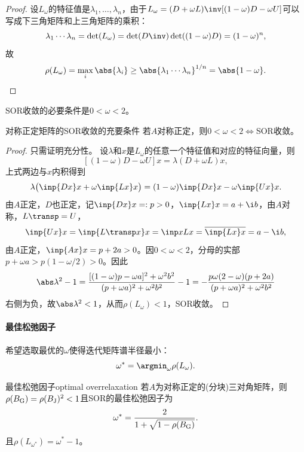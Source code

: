 \begin{proof}
    设$L_\omega$的特征值是$\lambda_1,\ldots,\lambda_n$，由于$L_\omega=(D+\omega L)\inv[(1-\omega)D-\omega U]$可以写成下三角矩阵和上三角矩阵的乘积：
    \[
        \lambda_1\cdots\lambda_n=\det(L_\omega)=\det(D\inv)\det((1-\omega)D)=(1-\omega)^n,
    \]
    故
    \[
        \rho(L_\omega)=\max_i\abs{\lambda_i}\geq\abs{\lambda_1\cdots\lambda_n}^{1/n}=\abs{1-\omega}.
        \qedhere
    \]
\end{proof}

\begin{corollary}
    SOR收敛的必要条件是$0<\omega<2$。
\end{corollary}

\begin{theorem}
    {对称正定矩阵的SOR收敛的充要条件}{}
    若$A$对称正定，则$0<\omega<2\iff$SOR收敛。
\end{theorem}

\begin{proof}
    只需证明充分性。
    设$\lambda$和$x$是$L_\omega$的任意一个特征值和对应的特征向量，则
    \[
        [(1-\omega)D-\omega U]x=\lambda(D+\omega L)x,
    \]
    上式两边与$x$内积得到
    \[
        \lambda\bigl(\inp{Dx}x+\omega\inp{Lx}x\bigr)=(1-\omega)\inp{Dx}x-\omega\inp{Ux}x.
    \]
    由$A$正定，$D$也正定，记$\inp{Dx}x=:p>0$，$\inp{Lx}x=a+\i b$，由$A$对称，$L\transp=U$，
    \[
        \inp{Ux}x=\inp{L\transp x}x=\inp x{Lx}=\overline{\inp{Lx}x}=a-\i b,
    \]
    由$A$正定，$\inp{Ax}x=p+2a>0$。因$0<\omega<2$，分母的实部$p+\omega a>p(1-\omega/2)>0$。因此
    \[
        \abs\lambda^2-1=\frac{[(1-\omega)p-\omega a]^2+\omega^2b^2}{(p+\omega a)^2+\omega^2b^2}-1=-\frac{p\omega(2-\omega)(p+2a)}{(p+\omega a)^2+\omega^2b^2}
    \]
    右侧为负，故$\abs\lambda^2<1$，从而$\rho(L_\omega)<1$，SOR收敛。
\end{proof}

\paragraph{最佳松弛因子}

希望选取最优的$\omega$使得迭代矩阵谱半径最小：
\begin{equation}
    \omega^*=\argmin_{\omega}\rho(L_\omega).
\end{equation}

\begin{theorem}
    {最佳松弛因子}{optimal overrelaxation}
    若$A$为对称正定的(分块)三对角矩阵，则$\rho(B_\text G)=\rho(B_\text J)^2<1$且SOR的最佳松弛因子为
    \begin{equation}
        \omega^*=\frac2{1+\sqrt{1-\rho(B_\text G)}}.
    \end{equation}
    且$\rho(L_{\omega^*})=\omega^*-1$。
\end{theorem}

